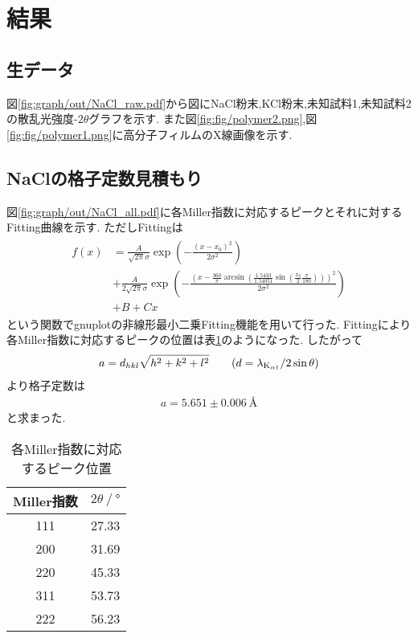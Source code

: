 \section{結果}
\subsection{生データ}
図\ref{fig:graph/out/NaCl_raw.pdf}から図にNaCl粉末,KCl粉末,未知試料1,未知試料2の散乱光強度-$2\theta$グラフを示す.
また図\ref{fig:fig/polymer2.png},図\ref{fig:fig/polymer1.png}に高分子フィルムのX線画像を示す.
\subsection{NaClの格子定数見積もり}
図\ref{fig:graph/out/NaCl_all.pdf}に各Miller指数に対応するピークとそれに対するFitting曲線を示す.
ただしFittingは
\begin{align}
  \begin{split}
    f(x)&=\frac{A}{\sqrt{2\pi}\sigma}\exp\left(-\frac{(x-x_0)^2}{2\sigma^2}\right)\\
    &+\frac{A}{2\sqrt{2\pi}\sigma}\exp\left(-\frac{\left(x-\frac{360}{\pi}\arcsin\left(\frac{1.5433}{1.54051}\sin\left(\frac{x_0}{2}\frac{\pi}{180}\right)\right)\right)^2}{2\sigma^2}\right)\\
    &+B+Cx
  \end{split}
\end{align}
という関数でgnuplotの非線形最小二乗Fitting機能を用いて行った.
Fittingにより各Miller指数に対応するピークの位置は表\ref{tab:miller_2theta}のようになった.
したがって
\begin{align}
  a=d_{hkl}\sqrt{h^2+k^2+l^2}\qquad(d=\lambda_{{\rm K}_{\alpha 1}}/2\sin\theta)
\end{align}
より格子定数は
\begin{align}
  a=5.651\pm 0.006\ \si{\angstrom}
\end{align}
と求まった.
\begin{table}[h]
  \caption{各Miller指数に対応するピーク位置}
  \label{tab:miller_2theta}
  \centering
  \begin{tabular}{cc}
  \hline
  Miller指数&$2\theta\ /\ \si{\degree}$\\
  \hline \hline
  111&27.33\\
  200&31.69\\
  220&45.33\\
  311&53.73\\
  222&56.23\\
  \hline
  \end{tabular}
\end{table}
